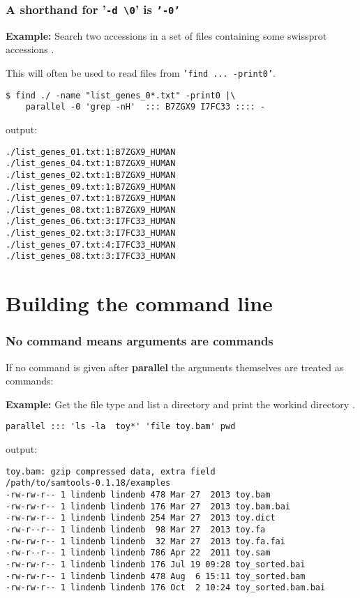 \documentclass{article}
\newcommand{\example}[1]{
\textbf{Example: } {\color[rgb]{0,0,1} #1 } .
}
\newcommand{\cmdoption}[1]{\texttt{'#1'}}
\def\prl{\textbf{parallel}}
\begin{document}
\subsubsection{A shorthand for '\texttt{-d  \textbackslash{}0}' is \cmdoption{-0} }

\example{Search two accessions in a set of files containing some  swissprot accessions }
This will often be used to read files from \cmdoption{find ... -print0}.
\begin{lstlisting}
$ find ./ -name "list_genes_0*.txt" -print0 |\
	parallel -0 'grep -nH'  ::: B7ZGX9 I7FC33 :::: -
\end{lstlisting}
output:
\begin{lstlisting}
./list_genes_01.txt:1:B7ZGX9_HUMAN
./list_genes_04.txt:1:B7ZGX9_HUMAN
./list_genes_02.txt:1:B7ZGX9_HUMAN
./list_genes_09.txt:1:B7ZGX9_HUMAN
./list_genes_07.txt:1:B7ZGX9_HUMAN
./list_genes_08.txt:1:B7ZGX9_HUMAN
./list_genes_06.txt:3:I7FC33_HUMAN
./list_genes_02.txt:3:I7FC33_HUMAN
./list_genes_07.txt:4:I7FC33_HUMAN
./list_genes_08.txt:3:I7FC33_HUMAN
\end{lstlisting}


\section{Building the command line}

\subsubsection{No command means arguments are commands}

If no command is given after \prl{} the arguments themselves are treated as commands:
\example{Get the file type and list a directory and print the workind directory}
\begin{lstlisting}
parallel ::: 'ls -la  toy*' 'file toy.bam' pwd
\end{lstlisting}
output:
\begin{lstlisting}
toy.bam: gzip compressed data, extra field
/path/to/samtools-0.1.18/examples
-rw-rw-r-- 1 lindenb lindenb 478 Mar 27  2013 toy.bam
-rw-rw-r-- 1 lindenb lindenb 176 Mar 27  2013 toy.bam.bai
-rw-rw-r-- 1 lindenb lindenb 254 Mar 27  2013 toy.dict
-rw-r--r-- 1 lindenb lindenb  98 Mar 27  2013 toy.fa
-rw-rw-r-- 1 lindenb lindenb  32 Mar 27  2013 toy.fa.fai
-rw-r--r-- 1 lindenb lindenb 786 Apr 22  2011 toy.sam
-rw-rw-r-- 1 lindenb lindenb 176 Jul 19 09:28 toy_sorted.bai
-rw-rw-r-- 1 lindenb lindenb 478 Aug  6 15:11 toy_sorted.bam
-rw-rw-r-- 1 lindenb lindenb 176 Oct  2 10:24 toy_sorted.bam.bai
\end{lstlisting}
\end{document}
